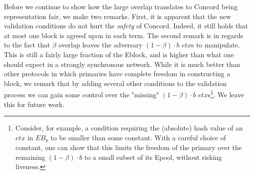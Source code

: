 Before we continue to show how the large overlap translates to Concord being representation fair, we make two remarks. First, it is apparent that the new validation conditions do not hurt the \emph{safety} of Concord. Indeed, it still holds that at most one block is agreed upon in each term. The second remark is in regards to the fact that $\beta$ overlap leaves the adversary $(1-\beta)\cdot b$ $etx$s to manipulate. This is still a fairly large fraction of the Eblock, and is higher than what one should expect in a strongly synchronous network. While it is much better than other protocols in which primaries have complete freedom in constructing a block, we remark that by adding several other conditions to the validation process we can gain some control over the "missing" $(1-\beta)\cdot b$ $etx$s\footnote{Consider, for example, a condition requiring the (absolute) hash value of an $etx$ in $EB_p$ to be smaller than some constant. With a careful choice of constant, one can show that this limits the freedom of the primary over the remaining $(1-\beta)\cdot b$ to a small subset of its Epool, without risking liveness.}. We leave this for future work.






